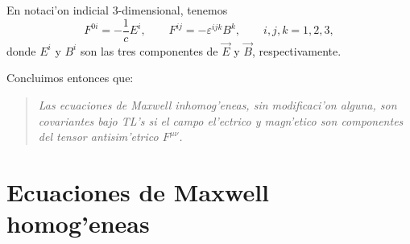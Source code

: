 En notaci'on indicial 3-dimensional, tenemos
\begin{equation}
F^{0i}   =-\frac{1}{c}E^i, \qquad F^{ij}   =-\varepsilon^{ijk}B^{k}, \qquad i,j,k=1,2,3,
\end{equation}
donde $E^i$ y $B^i$ son las tres componentes de $\vec{E}$ y $\vec{B}$, respectivamente.

Concluimos entonces que:
\begin{quotation}
\textit{Las ecuaciones de Maxwell inhomog'eneas, sin modificaci'on alguna, son covariantes bajo TL's si el campo el'ectrico y magn'etico son componentes del
tensor antisim'etrico $F^{\mu \nu}$.}
\end{quotation}

\section{Ecuaciones de Maxwell homog'eneas}

